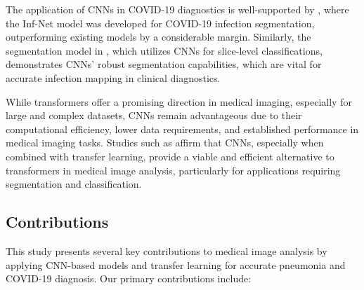 \documentclass[10pt]{article}
\begin{document}
The application of CNNs in COVID-19 diagnostics is well-supported by \cite{Fan2020}, where the Inf-Net model was developed for COVID-19 infection segmentation, outperforming existing models by a considerable margin. Similarly, the segmentation model in \cite{Afshar2021}, which utilizes CNNs for slice-level classifications, demonstrates CNNs' robust segmentation capabilities, which are vital for accurate infection mapping in clinical diagnostics.

While transformers offer a promising direction in medical imaging, especially for large and complex datasets, CNNs remain advantageous due to their computational efficiency, lower data requirements, and established performance in medical imaging tasks. Studies such as \cite{Shamshad2022} affirm that CNNs, especially when combined with transfer learning, provide a viable and efficient alternative to transformers in medical image analysis, particularly for applications requiring segmentation and classification.


\subsection{Contributions}

This study presents several key contributions to medical image analysis by applying CNN-based models and transfer learning for accurate pneumonia and COVID-19 diagnosis. Our primary contributions include:
\end{document}
